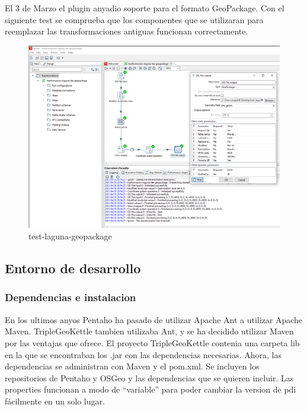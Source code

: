 El 3 de Marzo el plugin anyadio soporte para el formato GeoPackage. Con el siguiente test se comprueba que los
componentes que se utilizaran para reemplazar las transformaciones antiguas funcionan correctamente.

\begin{figure}[H]
    \includegraphics[width=\textwidth]{images/test-laguna-geopackage.png}
    \centering
    \caption{test-laguna-geopackage}
    \label{fig:test-laguna-geopackage}
\end{figure}

\subsection{Entorno de desarrollo}

\subsubsection{Dependencias e instalacion}

En los ultimos anyos Pentaho ha pasado de utilizar Apache Ant a utilizar Apache Maven. TripleGeoKettle tambien
utilizaba Ant, y se ha decidido utilizar Maven por las ventajas que ofrece. El proyecto TripleGeoKettle contenia
una carpeta lib en la que se encontraban los .jar con las dependencias necesarias. Ahora, las dependencias se
administran con Maven y el pom.xml. Se incluyen los repositorios de Pentaho y OSGeo y las dependencias que se
quieren incluir. Las properties funcionan a modo de ``variable'' para poder cambiar la version de pdi fácilmente
en un solo lugar.




